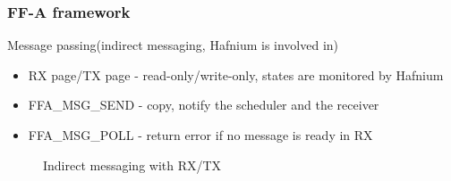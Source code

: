 \documentclass{beamer}
\begin{document}
\begin{frame}
  \frametitle{FF-A framework}
  Message passing(indirect messaging, Hafnium is involved in)
  \begin{itemize}
    \item RX page/TX page - read-only/write-only, states are monitored by Hafnium
    \item FFA\_MSG\_SEND - copy, notify the scheduler and the receiver
    \item FFA\_MSG\_POLL - return error if no message is ready in RX
  \end{itemize}
  \begin{figure}
    
        \caption{Indirect messaging with RX/TX}
      \end{figure}
\end{frame}
\end{document}
